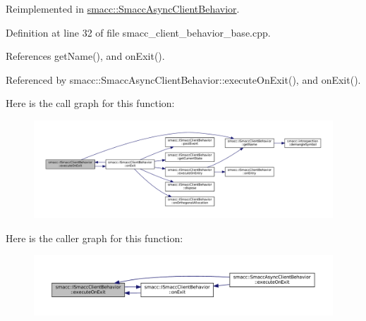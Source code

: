Reimplemented in \hyperlink{classsmacc_1_1SmaccAsyncClientBehavior_a3d982d370df4f133ad37c0b2370e9b82}{smacc\+::\+Smacc\+Async\+Client\+Behavior}.



Definition at line 32 of file smacc\+\_\+client\+\_\+behavior\+\_\+base.\+cpp.



References get\+Name(), and on\+Exit().



Referenced by smacc\+::\+Smacc\+Async\+Client\+Behavior\+::execute\+On\+Exit(), and on\+Exit().


Here is the call graph for this function\+:
\nopagebreak
\begin{figure}[H]
\begin{center}
\leavevmode
\includegraphics[width=350pt]{classsmacc_1_1ISmaccClientBehavior_ac88fbad78c928b4bca6d18659ddfd8c0_cgraph}
\end{center}
\end{figure}
Here is the caller graph for this function\+:
\nopagebreak
\begin{figure}[H]
\begin{center}
\leavevmode
\includegraphics[width=350pt]{classsmacc_1_1ISmaccClientBehavior_ac88fbad78c928b4bca6d18659ddfd8c0_icgraph}
\end{center}
\end{figure}
\mbox{\label{classsmacc_1_1ISmaccClientBehavior_a34fde34e48fa13db622ee60d8374d0b8}} 
